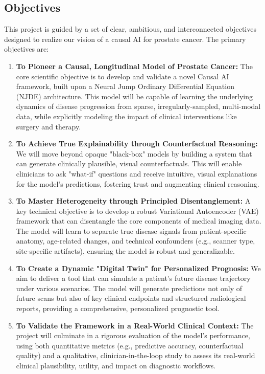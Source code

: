 \documentclass[11pt, a4paper]{article}
\begin{document}
\subsection{Objectives}
This project is guided by a set of clear, ambitious, and interconnected objectives designed to realize our vision of a causal AI for prostate cancer. The primary objectives are:
\begin{enumerate}
    \item \textbf{To Pioneer a Causal, Longitudinal Model of Prostate Cancer:} The core scientific objective is to develop and validate a novel Causal AI framework, built upon a Neural Jump Ordinary Differential Equation (NJDE) architecture. This model will be capable of learning the underlying dynamics of disease progression from sparse, irregularly-sampled, multi-modal data, while explicitly modeling the impact of clinical interventions like surgery and therapy.

    \item \textbf{To Achieve True Explainability through Counterfactual Reasoning:} We will move beyond opaque "black-box" models by building a system that can generate clinically plausible, visual counterfactuals. This will enable clinicians to ask "what-if" questions and receive intuitive, visual explanations for the model's predictions, fostering trust and augmenting clinical reasoning.

    \item \textbf{To Master Heterogeneity through Principled Disentanglement:} A key technical objective is to develop a robust Variational Autoencoder (VAE) framework that can disentangle the core components of medical imaging data. The model will learn to separate true disease signals from patient-specific anatomy, age-related changes, and technical confounders (e.g., scanner type, site-specific artifacts), ensuring the model is robust and generalizable.

    \item \textbf{To Create a Dynamic "Digital Twin" for Personalized Prognosis:} We aim to deliver a tool that can simulate a patient's future disease trajectory under various scenarios. The model will generate predictions not only of future scans but also of key clinical endpoints and structured radiological reports, providing a comprehensive, personalized prognostic tool.

    \item \textbf{To Validate the Framework in a Real-World Clinical Context:} The project will culminate in a rigorous evaluation of the model's performance, using both quantitative metrics (e.g., predictive accuracy, counterfactual quality) and a qualitative, clinician-in-the-loop study to assess its real-world clinical plausibility, utility, and impact on diagnostic workflows.
\end{enumerate}
\end{document}
